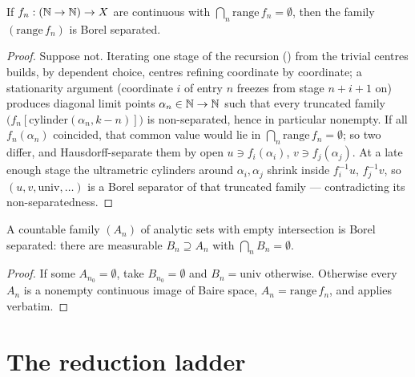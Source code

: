 \begin{theorem}\label{thm:dst-sepfam-ranges}
  \leanok
  If \(f_n:(\mathbb{N}\to\mathbb{N})\to X\) are continuous with \(\bigcap_n\mathrm{range}\,f_n=\emptyset\), then the
  family \((\mathrm{range}\,f_n)\) is Borel separated.
\end{theorem}
\begin{proof}\leanok
  Suppose not. Iterating one stage of the recursion () from the trivial
  centres builds, by dependent choice, centres refining coordinate by coordinate; a stationarity
  argument (coordinate \(i\) of entry \(n\) freezes from stage \(n+i+1\) on) produces diagonal
  limit points \(\alpha_n\in\mathbb{N}\to\mathbb{N}\) such that every truncated family
  \(\bigl(f_n[\mathrm{cylinder}(\alpha_n,k-n)]\bigr)\) is non-separated, hence in
  particular nonempty. If all \(f_n(\alpha_n)\) coincided, that common value would lie in
  \(\bigcap_n\mathrm{range}\,f_n=\emptyset\); so two differ, and Hausdorff-separate them by open
  \(u\ni f_i(\alpha_i)\), \(v\ni f_j(\alpha_j)\). At a late enough stage the ultrametric cylinders
  around \(\alpha_i,\alpha_j\) shrink inside \(f_i^{-1}u\), \(f_j^{-1}v\), so
  \((u,v,\mathrm{univ},\dots)\) is a Borel separator of that truncated family --- contradicting its
  non-separatedness.
\end{proof}

\begin{theorem}\label{thm:dst-first-separation}
  \leanok
  A countable family \((A_n)\) of analytic sets with empty intersection is Borel separated: there
  are measurable \(B_n\supseteq A_n\) with \(\bigcap_n B_n=\emptyset\).
\end{theorem}
\begin{proof}\leanok
  If some \(A_{n_0}=\emptyset\), take \(B_{n_0}=\emptyset\) and \(B_n=\mathrm{univ}\) otherwise.
  Otherwise every \(A_n\) is a nonempty continuous image of Baire space, \(A_n=\mathrm{range}\,f_n\),
  and  applies verbatim.
\end{proof}

\section{The reduction ladder}

